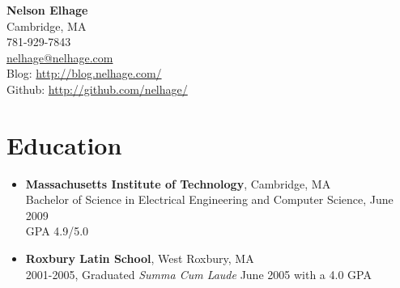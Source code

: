 \documentclass[letterpaper,10pt]{article}
\begin{document}
\begin{center}
  {\LARGE \bf Nelson Elhage}\\
  {\large
    Cambridge, MA \\
  }
  781-929-7843 \\
  \url{nelhage@nelhage.com} \\
  Blog: \url{http://blog.nelhage.com/} \\
  Github: \url{http://github.com/nelhage/}
\end{center}

\section*{Education}
\vspace*{-0.2cm}
\begin{itemize}
  \item \textbf{Massachusetts Institute of Technology}, Cambridge, MA
    \\ Bachelor of Science in Electrical
    Engineering and Computer Science, June 2009 \\
    GPA 4.9/5.0
    \vspace*{-0.2cm}
  \item \textbf{Roxbury Latin School}, West Roxbury, MA \\ 2001-2005,
    Graduated {\em Summa Cum Laude} June 2005 with a 4.0 GPA
\end{itemize}

\vspace*{-0.7cm}
\end{document}
